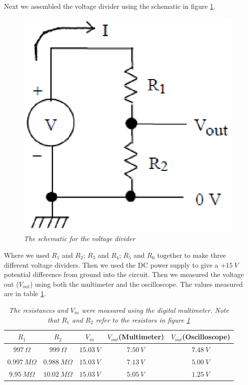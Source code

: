 \documentclass[11pt]{article}
\numberwithin{equation}{section}
\begin{document}
Next we assembled the voltage divider using the schematic in figure \ref{Volt.Div}. 
\begin{figure}[h]
\begin{center}
\includegraphics[scale=0.75]{Voltdiv.eps}
\caption{\textit{The schematic for the voltage divider}}
\label{Volt.Div}
\end{center}
\end{figure}
Where we used $R_1$ and $R_2$; $R_3$ and $R_4$; $R_5$ and $R_6$ together to make three different voltage dividers. Then we used the DC power supply to give a $+15\ V$ potential difference from ground into the circuit. Then we measured the voltage out ($V_{out}$) using both the multimeter and the oscilloscope. The values measured are in table \ref{Vout}.
\begin{table}[h]
\begin{center}
\begin{tabular}{ccc|cc}
$R_1$	&$R_2$	&$V_{in}$	&$V_{out}$(Multimeter)	&$V_{out}$(Oscilloscope)\\
\hline
$997\ \Omega$		&$999\ \Omega$		&$15.03\ V$	&$7.50\ V$	&$7.48\ V$\\
$0.997\ M\Omega$	&$0.988\ M\Omega$	&$15.03\ V$	&$7.13\ V$	&$5.00\ V$\\
$9.95\ M\Omega$		&$10.02\ M\Omega$	&$15.03\ V$	&$5.05\ V$	&$1.25\ V$
\end{tabular}
\end{center}
\caption{\textit{The resistances and $V_{in}$ were measured using the digital multimeter. Note that $R_1$ and $R_2$ refer to the resistors in figure \ref{Volt.Div}}}
\label{Vout}
\end{table}
\end{document}
